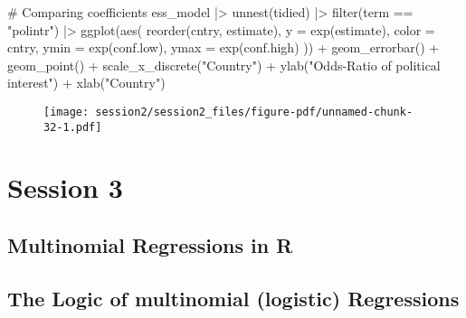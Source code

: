 \documentclass[
  letterpaper,
  DIV=11,
  numbers=noendperiod]{scrreprt}
\newenvironment{Shaded}{\begin{snugshade}}{\end{snugshade}}
\newcommand{\AttributeTok}[1]{\textcolor[rgb]{0.40,0.45,0.13}{#1}}
\newcommand{\CommentTok}[1]{\textcolor[rgb]{0.37,0.37,0.37}{#1}}
\newcommand{\FunctionTok}[1]{\textcolor[rgb]{0.28,0.35,0.67}{#1}}
\newcommand{\NormalTok}[1]{\textcolor[rgb]{0.00,0.23,0.31}{#1}}
\newcommand{\SpecialCharTok}[1]{\textcolor[rgb]{0.37,0.37,0.37}{#1}}
\newcommand{\StringTok}[1]{\textcolor[rgb]{0.13,0.47,0.30}{#1}}
\begin{document}
\begin{Shaded}
\begin{Highlighting}[]
\CommentTok{\# Comparing coefficients}
\NormalTok{ess\_model }\SpecialCharTok{|\textgreater{}} 
    \FunctionTok{unnest}\NormalTok{(tidied) }\SpecialCharTok{|\textgreater{}}  
    \FunctionTok{filter}\NormalTok{(term }\SpecialCharTok{==} \StringTok{"polintr"}\NormalTok{) }\SpecialCharTok{|\textgreater{}}
    \FunctionTok{ggplot}\NormalTok{(}\FunctionTok{aes}\NormalTok{(}
        \FunctionTok{reorder}\NormalTok{(cntry, estimate),}
        \AttributeTok{y =} \FunctionTok{exp}\NormalTok{(estimate),}
        \AttributeTok{color =}\NormalTok{ cntry,}
        \AttributeTok{ymin =} \FunctionTok{exp}\NormalTok{(conf.low),}
        \AttributeTok{ymax =} \FunctionTok{exp}\NormalTok{(conf.high)}
\NormalTok{    )) }\SpecialCharTok{+}
    \FunctionTok{geom\_errorbar}\NormalTok{() }\SpecialCharTok{+}
    \FunctionTok{geom\_point}\NormalTok{() }\SpecialCharTok{+}
    \FunctionTok{scale\_x\_discrete}\NormalTok{(}\StringTok{"Country"}\NormalTok{) }\SpecialCharTok{+}
    \FunctionTok{ylab}\NormalTok{(}\StringTok{"Odds{-}Ratio of political interest"}\NormalTok{) }\SpecialCharTok{+}
    \FunctionTok{xlab}\NormalTok{(}\StringTok{"Country"}\NormalTok{)}
\end{Highlighting}
\end{Shaded}

\begin{figure}[H]

{\centering \texttt{[image: session2/session2\_files/figure-pdf/unnamed-chunk-32-1.pdf]}

}

\end{figure}

\part{Session 3}

\hypertarget{multinomial-regressions-in-r}{%
\chapter{Multinomial Regressions in
R}\label{multinomial-regressions-in-r}}

\hypertarget{the-logic-of-multinomial-logistic-regressions}{%
\chapter{The Logic of multinomial (logistic)
Regressions}\label{the-logic-of-multinomial-logistic-regressions}}
\end{document}
